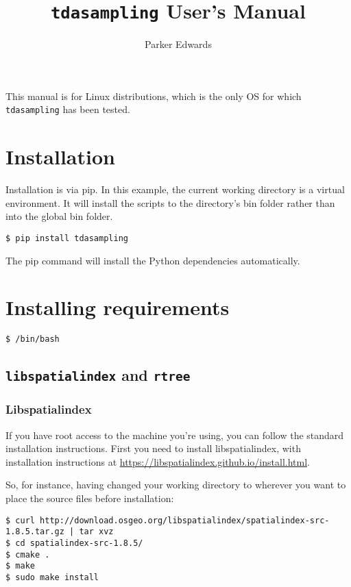 \documentclass[11pt]{article}
\begin{document}
\title{\texttt{tdasampling} User's Manual}

\author{
Parker Edwards
}

\maketitle

\tableofcontents
\pagebreak

This manual is for Linux distributions, which is the only OS for which \texttt{tdasampling} has been tested.

\section{Installation} 
Installation is via pip. In this example, the current working directory is a 
virtual environment. It will install the scripts to the directory's bin folder rather than into the global bin folder.

\begin{verbatim} 
$ pip install tdasampling
\end{verbatim} 

The pip command will install the Python dependencies automatically.

\section{Installing requirements}
\begin{verbatim} 
$ /bin/bash
\end{verbatim} 
\subsection{\texttt{libspatialindex} and \texttt{rtree}} 

\subsubsection{Libspatialindex}
If you have root access to the machine you're using, you can follow the standard installation instructions. First you need to install libspatialindex, with installation instructions at \url{https://libspatialindex.github.io/install.html}. 

So, for instance, having changed your working directory to wherever you want to place the source files before installation: 
\begin{verbatim} 
$ curl http://download.osgeo.org/libspatialindex/spatialindex-src-1.8.5.tar.gz | tar xvz
$ cd spatialindex-src-1.8.5/
$ cmake .
$ make 
$ sudo make install
\end{verbatim} 
\end{document}
